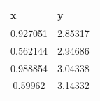 		


\listclose	%

\renewcommand{\arraystretch}{1.2}	%
\begin{table}[H]
	\centering
	\caption{\jadual}	%
	\begin{tabular}{|c|c|}
		\hline
		\multicolumn{1}{|l|}{\textbf{x}} & \multicolumn{1}{l|}{\textbf{y}} \\
		\hline
0.927051 & 2.85317 \\
0.562144 & 2.94686 \\
0.988854 & 3.04338 \\
0.59962 & 3.14332 \\
		\hline
	\end{tabular}
	\label{table:cell}%
\end{table}%


\clearpage